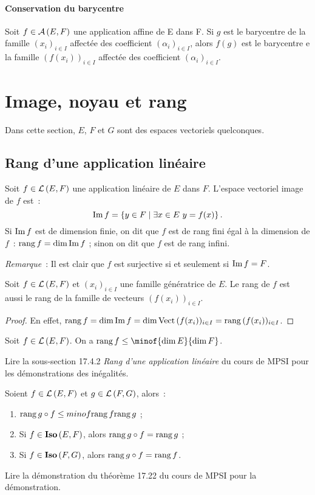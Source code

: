 \paragraph{Conservation du barycentre}
\begin{prop}
	Soit $f \in \mathcal{A}\left(E,F\right)$ une application affine de E dans F. Si $g$ est le barycentre de la famille $(x_i)_{i \in I}$ affectée des coefficient $(\alpha_i)_{i \in I}$, alors $f(g)$ est le barycentre e la famille $(f(x_i))_{i \in I}$ affectée des coefficient $(\alpha_i)_{i \in I}$.
\end{prop}
\section{Image, noyau et rang}
\label{sec-chap0:ImageNoyauRang}
Dans cette section, $E$, $F$ et $G$ sont des espaces vectoriels quelconques.
\subsection{Rang d'une application linéaire}
\begin{defdef}
	Soit $f \in \mathcal{L}\left(E,F\right)$ une application linéaire de $E$ dans $F$. L'espace vectoriel image de $f$ est~:
	\begin{equation}
		\operatorname{Im}{f} = \left\{y \in F\mathrel{}\middle|\mathrel{}\exists x \in E \ y=f(x)\right\}.
	\end{equation}
	Si $\operatorname{Im}{f}$ est de dimension finie, on dit que $f$ est de rang fini égal à la dimension de $f$~: $\operatorname{rang}{f} = \dim{\operatorname{Im}{f}}$ ; sinon on dit que $f$ est de rang infini.
\end{defdef}

\emph{Remarque}~: Il est clair que $f$ est surjective si et seulement si $\operatorname{Im}{f}=F$.

\begin{prop}
	Soit $f \in \mathcal{L}\left(E,F\right)$ et $(x_i)_{i \in I}$ une famille génératrice de $E$. Le rang de $f$ est aussi le rang de la famille de vecteurs $(f(x_i))_{i \in I}$.
\end{prop}
\begin{proof}
	En effet, $\operatorname{rang}{f} = \operatorname{dim}{\operatorname{Im}{f}} = \operatorname{dim}{\operatorname{Vect}{(f(x_i))_{i \in I}}} = \operatorname{rang}{(f(x_i))_{i \in I}}$.
\end{proof}
\begin{prop}
	Soit $f \in \mathcal{L}\left(E,F\right)$. On a $\rg{f} \leq \minof{\Dim{E}}{\Dim{F}}$.
\end{prop}
Lire la sous-section 17.4.2 \emph{Rang d’une application linéaire} du cours de MPSI pour les démonstrations des inégalités.
\begin{prop}
	Soient $f \in \mathcal{L}\left(E,F\right)$ et $g \in \mathcal{L}\left(F,G\right)$, alors~:
	\begin{enumerate}
		\item $\operatorname{rang}{g \circ f} \leq minof{\operatorname{rang}{f}}{\operatorname{rang}{g}}$ ;
		\item Si $f \in \mathbf{Iso}\left(E,F\right)$, alors $\operatorname{rang}{g \circ f} = \operatorname{rang}{g}$ ;
		\item Si $f \in \mathbf{Iso}\left(F,G\right)$, alors $\operatorname{rang}{g \circ f} = \operatorname{rang}{f}$.
	\end{enumerate}
\end{prop}
Lire la démonstration du théorème 17.22 du cours de MPSI pour la démonstration.
